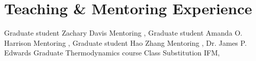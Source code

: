 \section{Teaching \& Mentoring Experience}

%
{Graduate student}%
{Zachary Davis}%
{Mentoring}%
{\DPA, \Purdue}%
{}
%
%
{Graduate student}%
{Amanda O. Harrison \textnormal{\cite{RuedaBecerril:2020ha}}}%
{Mentoring}%
{\DPA, \Purdue}%
{}
%
%
{Graduate student}%
{Hao Zhang \textnormal{\cite{Zhang:2020ch}}}%
{Mentoring}%
{\DPA, \Purdue}%
{}
%
%
{Dr. James P. Edwards}%
{Graduate Thermodynamics course}%
{Class Substitution}%
{IFM, \UMSNHes}%
{}
